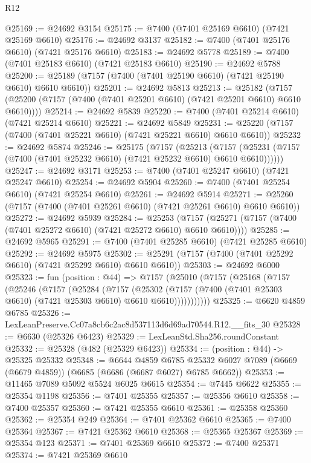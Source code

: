 \begin{lexlean}{R12}
\begin{coremodule}
@25169 := @24692 @3154
@25175 := @7400 (@7401 @25169 @6610) (@7421 @25169 @6610)
@25176 := @24692 @3137
@25182 := @7400 (@7401 @25176 @6610) (@7421 @25176 @6610)
@25183 := @24692 @5778
@25189 := @7400 (@7401 @25183 @6610) (@7421 @25183 @6610)
@25190 := @24692 @5788
@25200 := @25189 (@7157 (@7400 (@7401 @25190 @6610) (@7421 @25190 @6610) @6610 @6610))
@25201 := @24692 @5813
@25213 := @25182
    (@7157 (@25200 (@7157 (@7400 (@7401 @25201 @6610) (@7421 @25201 @6610) @6610 @6610))))
@25214 := @24692 @5839
@25220 := @7400 (@7401 @25214 @6610) (@7421 @25214 @6610)
@25221 := @24692 @5849
@25231 := @25220 (@7157 (@7400 (@7401 @25221 @6610) (@7421 @25221 @6610) @6610 @6610))
@25232 := @24692 @5874
@25246 := @25175
    (@7157
      (@25213
        (@7157 (@25231 (@7157 (@7400 (@7401 @25232 @6610) (@7421 @25232 @6610) @6610 @6610))))))
@25247 := @24692 @3171
@25253 := @7400 (@7401 @25247 @6610) (@7421 @25247 @6610)
@25254 := @24692 @5904
@25260 := @7400 (@7401 @25254 @6610) (@7421 @25254 @6610)
@25261 := @24692 @5914
@25271 := @25260 (@7157 (@7400 (@7401 @25261 @6610) (@7421 @25261 @6610) @6610 @6610))
@25272 := @24692 @5939
@25284 := @25253
    (@7157 (@25271 (@7157 (@7400 (@7401 @25272 @6610) (@7421 @25272 @6610) @6610 @6610))))
@25285 := @24692 @5965
@25291 := @7400 (@7401 @25285 @6610) (@7421 @25285 @6610)
@25292 := @24692 @5975
@25302 := @25291 (@7157 (@7400 (@7401 @25292 @6610) (@7421 @25292 @6610) @6610 @6610))
@25303 := @24692 @6000
@25323 := fun (position : @44) =>
  @7157
    (@25010
      (@7157
        (@25168
          (@7157
            (@25246
              (@7157
                (@25284
                  (@7157
                    (@25302
                      (@7157 (@7400 (@7401 @25303 @6610) (@7421 @25303 @6610) @6610 @6610)))))))))))
@25325 := @6620 @4859 @6785
@25326 := LexLeanPreserve.Cc07a8cb6c2ac8d537113d6d69ad70544.R12.__fits_30
@25328 := @6630 (@25326 @6423)
@25329 := LexLeanStd.Sha256.roundConstant
@25332 := @25328 (@482 (@25329 @6423))
@25334 := (position : @44) -> @25325 @25332
@25348 := @6644
    @4859
    @6785
    @25332
    @6027
    @7089
    (@6669 (@6679 @4859))
    (@6685 (@6686 (@6687 @6027) @6785 @6662))
@25353 := @11465 @7089 @5092 @5524 @6025 @6615
@25354 := @7445 @6622
@25355 := @25354 @1198
@25356 := @7401 @25355
@25357 := @25356 @6610
@25358 := @7400 @25357
@25360 := @7421 @25355 @6610
@25361 := @25358 @25360
@25362 := @25354 @249
@25364 := @7401 @25362 @6610
@25365 := @7400 @25364
@25367 := @7421 @25362 @6610
@25368 := @25365 @25367
@25369 := @25354 @123
@25371 := @7401 @25369 @6610
@25372 := @7400 @25371
@25374 := @7421 @25369 @6610

\end{coremodule}
\end{lexlean}
